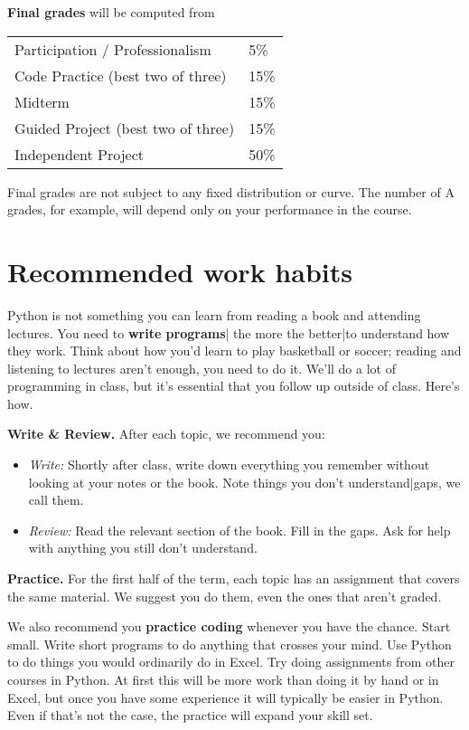 {\bf Final grades\/} will be computed from
\begin{center}
\begin{tabular}{ll}
Participation / Professionalism & 5\% \\
Code Practice (best two of three) & 15\% \\
Midterm       & 15\% \\
Guided Project (best two of three)       & 15\% \\
Independent Project     & 50\% \\
\end{tabular}
\end{center}

Final grades are not subject to any fixed distribution or curve. The number of A grades, for example, will depend only on your performance in the course.


\section*{Recommended work habits}

Python is not something you can learn from reading a book and attending lectures.
You need to {\bf write programs\/}|
the more the better|to understand how they work.
Think about how you'd learn to play basketball or soccer;
reading and listening to lectures aren't enough, you need to do it.
We'll do a lot of programming in class, but it's {essential\/} that you
follow up outside of class.
Here's how.

{\bf Write \& Review.\/}
After each topic, we recommend you:
\begin{itemize}
\item {\it Write:\/}  Shortly after class, write down everything you remember
without looking at your notes or the book. Note things you don't understand|gaps, we call them.

\item {\it Review:\/} Read the relevant section of the book.  Fill in the gaps. Ask for help with anything you still don't understand.
\end{itemize}

{\bf Practice.\/}
For the first half of the term, each topic has an assignment that covers the same material.
We suggest you do them, even the ones that aren't graded.

We also recommend you {\bf practice coding\/} whenever you have the chance.
Start small. Write short programs to do anything that crosses your mind.
Use Python to do things you would ordinarily do in Excel.
Try doing assignments from other courses in Python.
At first this will be more work than doing it by hand or in Excel,
but once you have some experience it will typically be easier in Python.
Even if that's not the case, the practice will expand your skill set.


